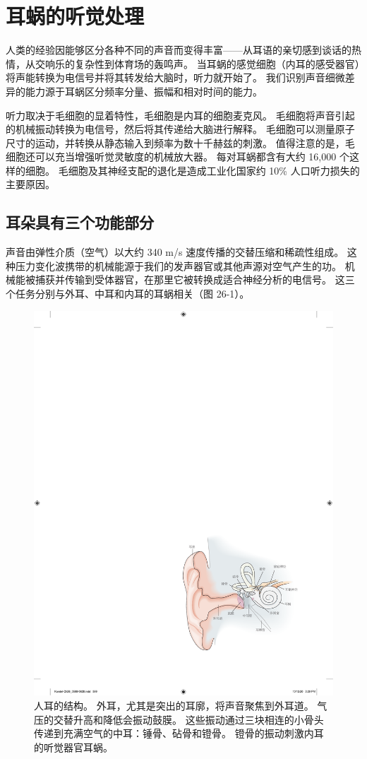 \chapter{耳蜗的听觉处理} \label{chap:chap26}
人类的经验因能够区分各种不同的声音而变得丰富——从耳语的亲切感到谈话的热情，从交响乐的复杂性到体育场的轰鸣声。 
当耳蜗的感觉细胞（内耳的感受器官）将声能转换为电信号并将其转发给大脑时，听力就开始了。 
我们识别声音细微差异的能力源于耳蜗区分频率分量、振幅和相对时间的能力。

听力取决于毛细胞的显着特性，毛细胞是内耳的细胞麦克风。 
毛细胞将声音引起的机械振动转换为电信号，然后将其传递给大脑进行解释。 
毛细胞可以测量原子尺寸的运动，并转换从静态输入到频率为数十千赫兹的刺激。 
值得注意的是，毛细胞还可以充当增强听觉灵敏度的机械放大器。 
每对耳蜗都含有大约 16,000 个这样的细胞。 
毛细胞及其神经支配的退化是造成工业化国家约 10\% 人口听力损失的主要原因。



\section{耳朵具有三个功能部分}
声音由弹性介质（空气）以大约 340 m/s 速度传播的交替压缩和稀疏性组成。 
这种压力变化波携带的机械能源于我们的发声器官或其他声源对空气产生的功。 
机械能被捕获并传输到受体器官，在那里它被转换成适合神经分析的电信号。 
这三个任务分别与外耳、中耳和内耳的耳蜗相关（图 26-1）。


\begin{figure}[htbp]
	\centering
	\includegraphics[width=0.5\linewidth]{chap26/fig_26_1}
	\caption{人耳的结构。 
		外耳，尤其是突出的耳廓，将声音聚焦到外耳道。 气压的交替升高和降低会振动鼓膜。 这些振动通过三块相连的小骨头传递到充满空气的中耳：锤骨、砧骨和镫骨。 
		镫骨的振动刺激内耳的听觉器官耳蜗。}
	\label{fig:26_1}
\end{figure}

